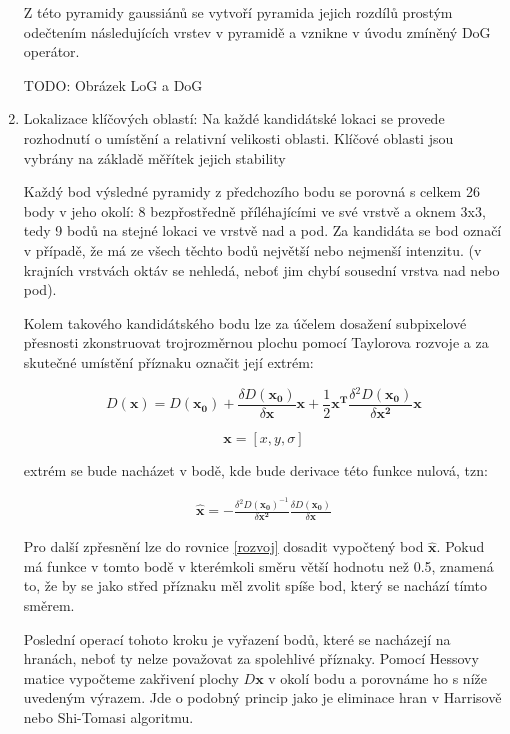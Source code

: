 \begin{enumerate}
			Z této pyramidy gaussiánů se vytvoří pyramida jejich rozdílů prostým odečtením následujících vrstev v pyramidě a vznikne v úvodu zmíněný DoG operátor.		 
			
			\huge{TODO: Obrázek LoG a DoG} \normalsize
			
		\item Lokalizace klíčových oblastí: Na každé kandidátské lokaci se provede rozhodnutí o umístění a relativní velikosti oblasti. Klíčové oblasti jsou vybrány na základě měřítek jejich stability
		
			Každý bod výsledné pyramidy z předchozího bodu se porovná s celkem 26 body v jeho okolí: 8 bezpřostředně příléhajícími ve své vrstvě a oknem 3x3, tedy 9 bodů na stejné lokaci ve vrstvě nad a pod. Za kandidáta se bod označí v případě, že má ze všech těchto bodů největší nebo nejmenší intenzitu.
			(v krajních vrstvách oktáv se nehledá, neboť jim chybí sousední vrstva nad nebo pod).
			
			Kolem takového kandidátského bodu lze za účelem dosažení subpixelové přesnosti zkonstruovat trojrozměrnou plochu pomocí Taylorova rozvoje a za skutečné umístění příznaku označit její extrém:
			
			\begin{equation}
			\label{rozvoj}
			D(\mathbf{x}) = D(\mathbf{x_0}) + \frac{\delta D(\mathbf{x_0})}{\delta \mathbf{x}} \mathbf{x} + \frac{1}{2} \mathbf{x^T}\frac{\delta{}^2 D(\mathbf{x_0})}{\delta{}\mathbf{x^2}}\mathbf{x} 
			\end{equation}
			
			\begin{equation} \mathbf{x} = [x, y, \sigma{}] \end{equation}
	
			extrém  se bude nacházet v bodě, kde bude derivace této funkce nulová, tzn:
			
			\begin{align}
			\mathbf{\hat{x}} = - \frac{\delta{}^2 D(\mathbf{x_0})^{-1}}{\delta{}\mathbf{x^2}}
			\frac{\delta D(\mathbf{x_0})}{\delta \mathbf{x}}
			\end{align}
			
			Pro další zpřesnění lze do rovnice \ref{rozvoj} dosadit vypočtený bod $\hat{\mathbf{x}}$. Pokud má funkce v tomto bodě v kterémkoli směru větší hodnotu než 0.5, znamená to, že by se jako střed příznaku měl zvolit spíše
			bod, který se nachází tímto směrem.
			
			Poslední operací tohoto kroku je vyřazení bodů, které se nacházejí na hranách, neboť ty nelze považovat za spolehlivé příznaky. Pomocí Hessovy matice vypočteme zakřivení plochy $D{\mathbf{x}}$ v okolí bodu a porovnáme
			ho s níže uvedeným výrazem. Jde o podobný princip jako je eliminace hran v Harrisově nebo Shi-Tomasi algoritmu.
			

\end{enumerate}
